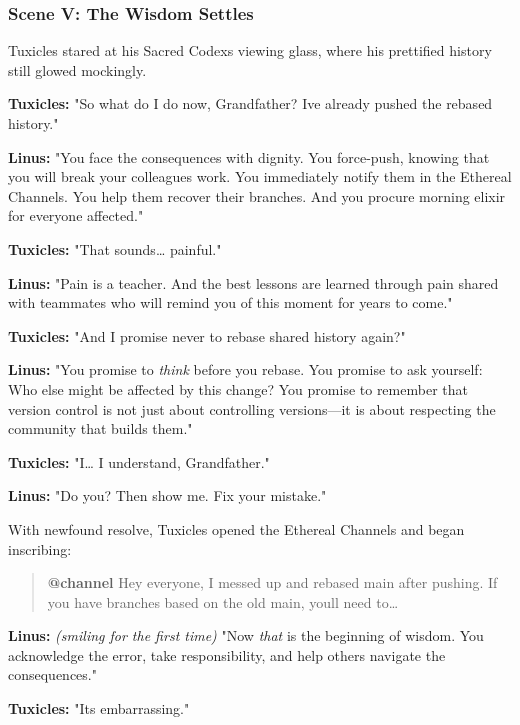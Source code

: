 \bookdivider

\subsubsection{Scene V: The Wisdom Settles}\label{scene-v-the-wisdom-settles}

Tuxicles stared at his Sacred Codex\textquotesingle s viewing glass, where his prettified history still glowed mockingly.

\textbf{Tuxicles:} "So what do I do now, Grandfather? I\textquotesingle ve already pushed the rebased history."

\textbf{Linus:} "You face the consequences with dignity. You force-push, knowing that you will break your colleagues\textquotesingle{} work. You immediately notify them in the Ethereal Channels. You help them recover their branches. And you procure morning elixir for everyone affected."

\textbf{Tuxicles:} "That sounds\ldots{} painful."

\textbf{Linus:} "Pain is a teacher. And the best lessons are learned through pain shared with teammates who will remind you of this moment for years to come."

\textbf{Tuxicles:} "And I promise never to rebase shared history again?"

\textbf{Linus:} "You promise to \emph{think} before you rebase. You promise to ask yourself: \textquotesingle Who else might be affected by this change?\textquotesingle{} You promise to remember that version control is not just about controlling versions---it is about respecting the community that builds them."

\textbf{Tuxicles:} "I\ldots{} I understand, Grandfather."

\textbf{Linus:} "Do you? Then show me. Fix your mistake."

With newfound resolve, Tuxicles opened the Ethereal Channels and began inscribing:

\begin{quote}
\textbf{@channel} Hey everyone, I messed up and rebased main after pushing. If you have branches based on the old main, you\textquotesingle ll need to\ldots{}
\end{quote}

\textbf{Linus:} \emph{(smiling for the first time)} "Now \emph{that} is the beginning of wisdom. You acknowledge the error, take responsibility, and help others navigate the consequences."

\textbf{Tuxicles:} "It\textquotesingle s embarrassing."

